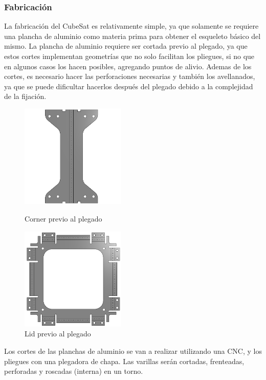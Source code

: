     \subsubsection{Fabricación}

      La fabricación del CubeSat es relativamente simple, ya que solamente se requiere una
      plancha de aluminio como materia prima para obtener el esqueleto básico del mismo. La
      plancha de aluminio requiere ser cortada previo al plegado, ya que estos cortes implementan
      geometrías que no solo facilitan los pliegues, si no que en algunos casos los hacen posibles,
      agregando puntos de alivio. Ademas de los cortes, es necesario hacer las perforaciones necesarias
      y también los avellanados, ya que se puede dificultar hacerlos después del plegado
      debido a la complejidad de la fijación.
      \begin{figure}[H]
        \begin{minipage}{0.5\textwidth}
          \centering
          \includegraphics[width=50mm]{image/structure/cornerFlat.png}
          \caption{Corner previo al plegado}
          \label{fig:cornerfp}
        \end{minipage}
        \begin{minipage}{0.5\textwidth}
          \centering
          \includegraphics[width=50mm]{image/structure/lidFlat.png}
          \caption{Lid previo al plegado}
          \label{fig:lidfp}
        \end{minipage}
      \end{figure}
      Los cortes de las planchas de aluminio se van a realizar utilizando una CNC, y los pliegues
      con una plegadora de chapa.
      Las varillas serán cortadas, frenteadas, perforadas y roscadas (interna) en un torno.

